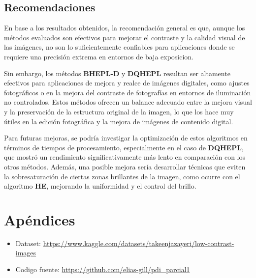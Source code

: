 \documentclass[sigchi]{acmart}
\begin{document}
\subsection{Recomendaciones}
\label{subsec:recomendaciones}

En base a los resultados obtenidos, la recomendación general es que, aunque los métodos
evaluados son efectivos para mejorar el contraste y la calidad visual de las imágenes, no son
lo suficientemente confiables para aplicaciones donde se requiere una precisión extrema
en entornos de baja exposicion.

Sin embargo, los métodos \textbf{BHEPL-D} y \textbf{DQHEPL} resultan ser altamente efectivos
para aplicaciones de mejora y realce de imágenes digitales, como ajustes fotográficos o en la
mejora del contraste de fotografías en entornos de iluminación no controlados. Estos métodos
ofrecen un balance adecuado entre la mejora visual y la preservación de la estructura original
de la imagen, lo que los hace muy útiles en la edición fotográfica y la mejora de imágenes de
contenido digital.

Para futuras mejoras, se podría investigar la optimización de estos algoritmos en términos de
tiempos de procesamiento, especialmente en el caso de \textbf{DQHEPL}, que mostró un
rendimiento significativamente más lento en comparación con los otros métodos. Además, una
posible mejora sería desarrollar técnicas que eviten la sobresaturación de ciertas zonas
brillantes de la imagen, como ocurre con el algoritmo \textbf{HE}, mejorando la uniformidad y
el control del brillo.

\section{Apéndices}
\label{sec:apendices}

\begin{itemize}
	\item Dataset: \url{https://www.kaggle.com/datasets/takeenjazayeri/low-contrast-images}
	\item Codigo fuente: \url{https://github.com/elias-gill/pdi_parcial1}
\end{itemize}

\nocite{*} %


\label{sec:bibliography}
\end{document}
